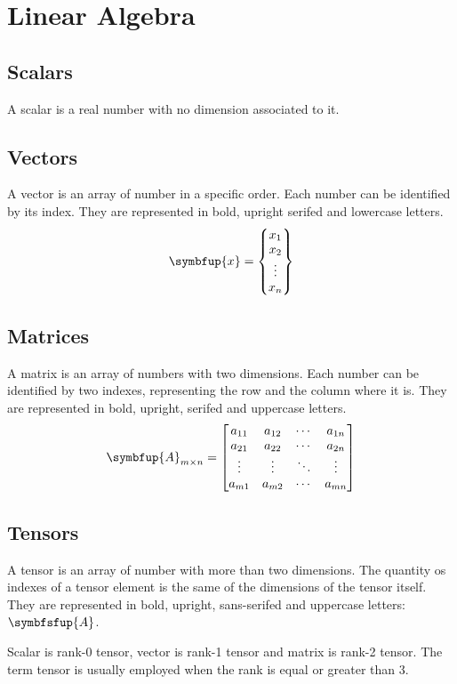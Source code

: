 \chapter{Linear Algebra}

\section{Scalars}

A scalar is a real number with no dimension associated to it.

\section{Vectors}

A vector is an array of number in a specific order. Each number can be identified by its index. They are represented in bold, upright serifed and lowercase letters.
%
\begin{equation}
    \symbfup{x} = \begin{Bmatrix}
        x_1 \\
        x_2 \\
        \vdots \\
        x_n
    \end{Bmatrix}
\end{equation}

\section{Matrices}

A matrix is an array of numbers  with two dimensions. Each number can be identified by two indexes, representing the row and the column where it is. They are represented in bold, upright, serifed and uppercase letters.
%
\begin{equation}
    \symbfup{A}_{m\times n} = \begin{bmatrix}
        a_{11} & a_{12} & \cdots & a_{1n} \\
        a_{21} & a_{22} & \cdots & a_{2n} \\ 
        \vdots & \vdots & \ddots & \vdots \\
        a_{m1} & a_{m2} & \cdots & a_{mn}
    \end{bmatrix}
\end{equation}

\section{Tensors}

A tensor is an array of number with more than two dimensions. The quantity os indexes of a tensor element is the same of the dimensions of the tensor itself. They are represented in bold, upright, sans-serifed and uppercase letters: \(\symbfsfup{A}\).

Scalar is rank-0 tensor, vector is rank-1 tensor and matrix is rank-2 tensor. The term tensor is usually employed when the rank is equal or greater than 3.